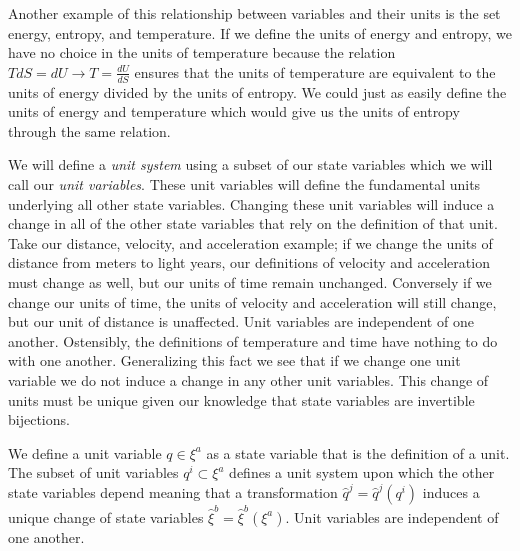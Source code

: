 \documentclass{article}
\begin{document}
	
	Another example of this relationship between variables and their units is the set energy, entropy, and temperature. If we define the units of energy and entropy, we have no choice in the units of temperature because the relation $T dS = dU \to T = \frac{dU}{dS}$ ensures that the units of temperature are equivalent to the units of energy divided by the units of entropy. We could just as easily define the units of energy and temperature which would give us the units of entropy through the same relation.
	
	 We will define a \textit{unit system} using a subset of our state variables which we will call our \textit{unit variables}. These unit variables will define the fundamental units underlying all other state variables. Changing these unit variables will induce a change in all of the other state variables that rely on the definition of that unit. Take our distance, velocity, and acceleration example; if we change the units of distance from meters to light years, our definitions of velocity and acceleration must change as well, but our units of time remain unchanged. Conversely if we change our units of time, the units of velocity and acceleration will still change, but our unit of distance is unaffected. Unit variables are independent of one another. Ostensibly, the definitions of temperature and time have nothing to do with one another.  Generalizing this fact we see that if we change one unit variable we do not induce a change in any other unit variables. This change of units must be unique given our knowledge that state variables are invertible bijections.

\begin{defn}
	We define a unit variable $q \in \xi^a$ as a state variable that is the definition of a unit. The subset of unit variables $q^i \subset \xi^a$ defines a unit system upon which the other state variables depend meaning that a transformation $\hat{q}^j = \hat{q}^j(q^i)$ induces a unique change of state variables $\hat{\xi}^b = \hat{\xi}^b(\xi^a)$. Unit variables are independent of one another.
\end{defn}

	
\end{document}
